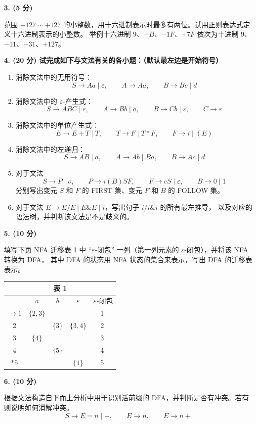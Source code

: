 \documentclass[UTF8,zihao=-4]{ctexart}
\newcommand{\score}[1]{\textbf{(#1 分)}}
\newcommand{\eps}{\varepsilon}
\newcommand{\gto}{\rightarrow}
\newcommand{\set}[1]{\{#1\}}
\newcommand{\circnum}[1]{\textcircled{\scriptsize #1}}
\newcommand{\qtitle}[3]{\vspace{0.6em}\textbf{#1. \score{#2} #3}\par}
\begin{document}
\qtitle{3}{5}{}
范围 $-127\sim +127$ 的小整数，用十六进制表示时最多有两位。试用正则表达式定义十六进制表示的小整数。
举例十六进制 $9$、$-B$、$-1F$、$+7F$ 依次为十进制 $9$、$-11$、$-31$、$+127$。

\qtitle{4}{20}{试完成如下与文法有关的各小题：（默认最左边是开始符号）}
\begin{enumerate}[label=(\arabic*)]
  \item 消除文法中的无用符号：
  \[
    S\gto Aa\mid\eps,\qquad A\gto Aa,\qquad B\gto Bc\mid d
  \]
  \item 消除文法中的 $\eps$-产生式：
  \[
    S\gto ABC\mid\eps,\qquad A\gto Bb\mid a,\qquad B\gto Cb\mid\eps,\qquad C\gto\eps
  \]
  \item 消除文法中的单位产生式：
  \[
    E\gto E+T\mid T,\qquad T\gto F\mid T*F,\qquad F\gto i\mid(E)
  \]
  \item 消除文法中的左递归：
  \[
    S\gto AB\mid a,\qquad A\gto Ab\mid Ba,\qquad B\gto Ac\mid d
  \]
  \item 对于文法
  \[
    S\gto P\mid o,\qquad P\gto i(B)SF,\qquad F\gto eS\mid\eps,\qquad B\gto 0\mid 1
  \]
  分别写出变元 $S$ 和 $F$ 的 FIRST 集、变元 $F$ 和 $B$ 的 FOLLOW 集。
  \item 对于文法 $E\gto E/E\mid E\&E\mid i$，写出句子 $i/i\&i$ 的所有最左推导，
  以及对应的语法树，并判断该文法是不是歧义的。
\end{enumerate}

\qtitle{5}{10}{}
填写下页 NFA 迁移表 1 中 ``$\eps$-闭包'' 一列（第一列元素的 $\eps$-闭包），并将该 NFA 转换为 DFA，
其中 DFA 的状态用 NFA 状态的集合来表示，写出 DFA 的迁移表表示。

\begin{center}
\begin{tabular}{c|c|c|c|c}
\multicolumn{5}{c}{表 1}\\
\hline
 & $a$ & $b$ & $\eps$ & $\eps$-闭包\\
\hline
$\to 1$ & $\set{2,3}$ & & & \circnum{1}\\
2 & & $\set{3}$ & $\set{3,4}$ & \circnum{2}\\
3 & $\set{4}$ & & & \circnum{3}\\
4 & & $\set{5}$ & & \circnum{4}\\
$*5$ & & & $\set{1}$ & \circnum{5}\\
\hline
\end{tabular}
\end{center}

\qtitle{6}{10}{}
根据文法构造自下而上分析中用于识别活前缀的 DFA，并判断是否有冲突。若有则说明如何消解冲突。
\[
  S\gto E=n\mid +,\qquad E\gto n,\qquad E\gto n+
\]
\end{document}
